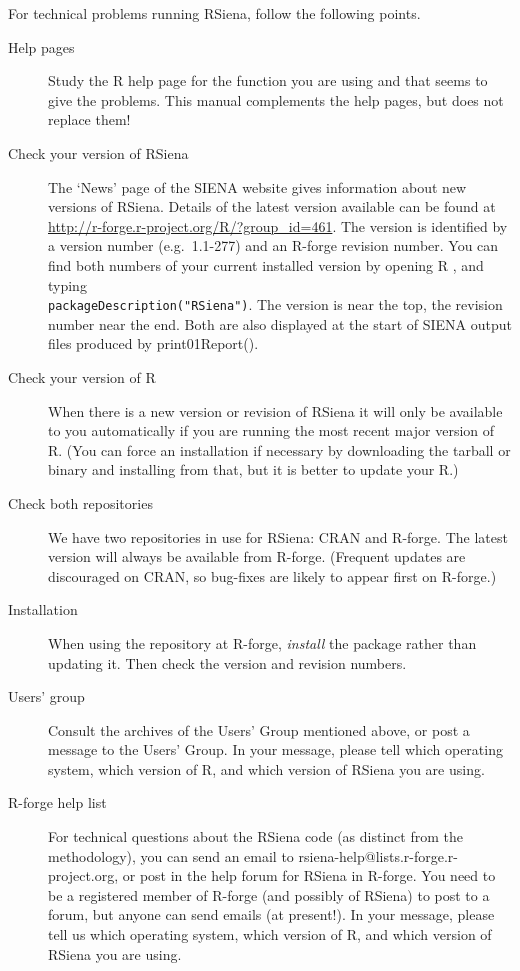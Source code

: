 \documentclass[a4paper,fleqn,11pt]{article}
\newcommand{\+}{\, + \,}
\newcommand{\sfn}[1]{\textsf{#1}}
\newcommand{\R}{{\sf R }}
\newcommand{\Rn}{{\sf R}}
\newcommand{\rs}{{\sf RSiena}}
\newcommand{\RS}{{\sf RSiena }}
\newcommand{\SI}{{\sf SIENA }}
\begin{document}
For technical problems running \rs, follow the following points.
\begin{description}
\item[Help pages] Study the \R help page for the function you are using and that seems to give
      the problems. This manual complements the help pages,
      but does not replace them!
\item[Check your version of \RS]
  The `News' page of the \SI website gives information about new versions
  of \rs. Details of the latest version available can
  be found at \url{http://r-forge.r-project.org/R/?group_id=461}. The version is
  identified by a version number (e.g.\ 1.1-277) and an R-forge revision
  number. You can find both numbers of your current installed version by
  opening \R, and typing \\
  \verb|packageDescription("RSiena")|. The version is
  near the top, the revision number near the end. Both are also displayed at the
  start of \SI output files produced by \sfn{print01Report()}.
\item[Check your version of \Rn] When there is a new version or revision of \RS
  it will only be available to you automatically if you are running the most
  recent major version of \Rn. (You can force an installation if
  necessary by downloading the tarball or binary and installing from that, but
  it is better to update your \Rn.)
\item [Check both repositories] We have two repositories in use for \rs: CRAN
  and R-forge. The latest version will always be available from
  R-forge. (Frequent updates are discouraged on CRAN, so bug-fixes are likely to
  appear first on R-forge.)
\item[Installation] When using the repository at R-forge, \emph{install} the
  package rather than updating it. Then check the version and revision numbers.
\item[Users' group] Consult the archives of the Users' Group mentioned above, or post
     a message to the Users' Group. In your message,
     please tell which operating system, which version of \Rn, and which version
     of \RS you are using.
\item[R-forge help list]
     For technical questions about the \RS code (as distinct from the
     methodology), you can send an email to
     rsiena-help@lists.r-forge.r-project.org, or post in the help forum for \RS in
     R-forge. You need to be a registered member of R-forge (and possibly of \rs)
     to post to a forum, but anyone can send emails (at present!). In your message,
     please tell us which operating system, which version of \Rn, and which version
     of \RS you are using.
\end{description}
\end{document}
